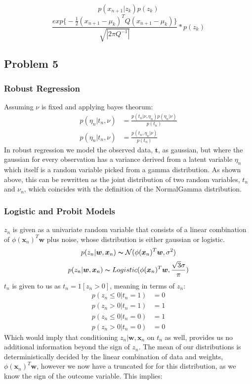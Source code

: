 \documentclass[a4paper,12pt]{article}
\begin{document}
$$
p(x_{n+1} | z_k)p(z_k)
$$
$$
\frac{exp \Big\{ -\frac{1}{2} (x_{n+1} - \mu_k)^T Q (x_{n+1} - \mu_k) \Big\} }{\sqrt{|2\pi Q^{-1}|}} * p(z_k)
$$


\subsection*{Problem 5}

\subsubsection*{Robust Regression}

Assuming $\nu$ is fixed and applying bayes theorum:
%
\begin{align*}
p( \eta_n | t_n, \nu ) &= \frac{p(t_n | \nu, \eta_n) p(\eta_n | \nu)}{p(t_n)} \\
p( \eta_n | t_n, \nu ) &= \frac{p(t_n, \eta_n | \nu)}{p(t_n)}
\end{align*}
%
In robust regression we model the observed data, $\bm{t}$, as gaussian, but where the gaussian for every observation has a variance derived from a latent variable $\eta_n$ which itself is a random variable picked from a gamma distribution. As shown above, this can be rewritten as the joint distribution of two random variables, $t_n$ and $\nu_n$, which coincides with the definition of the NormalGamma distribution.

\subsubsection*{Logistic and Probit Models}

%
$z_n$ is given as a univariate random variable that consists of a linear combination of $\phi(\bm{x}_n)^T\bm{w}$ plus noise, whose distribution is either gaussian or logistic.
%
$$
p(z_n | \bm{w}, \bm{x}_n) \thicksim \mathcal{N}(\phi(\bm{x}_n)^T\bm{w}, \sigma^2)
$$
$$
p(z_n | \bm{w}, \bm{x}_n) \thicksim Logistic(\phi(\bm{x}_n)^T\bm{w}, \frac{\sqrt{3}\sigma}{\pi})
$$
%
$t_n$ is given to us as $t_n = 1[z_n > 0]$, meaning in terms of $z_n$:
%
\begin{align*}
p(z_n \leq 0 | t_n = 1) &= 0 \\
p(z_n > 0 | t_n = 1) &= 1 \\
p(z_n \leq 0 | t_n = 0) &= 1 \\
p(z_n  > 0 | t_n = 0) &= 0
\end{align*}
%
Which would imply that conditioning $z_n | \bm{w}, \bm{x}_n$ on $t_n$ as well, provides us no additional information beyond the sign of $z_n$. The mean of our distributions is deterministically decided by the linear combination of data and weights, $\phi(\bm{x}_n)^T\bm{w}$, however we now have a truncated for for this distribution, as we know the sign of the outcome variable. This implies:
\end{document}
